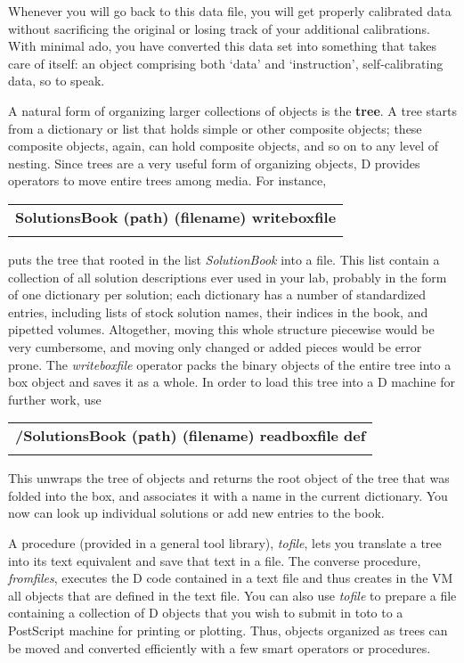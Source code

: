 Whenever  you  will  go back to this data file,  you  will  get  properly calibrated  data  without  sacrificing the original or  losing  track  of your additional calibrations.  With minimal ado,  you have converted this data set into something that takes care of itself:  an object  comprising both `data' and `instruction', self-calibrating data, so to speak.

A natural form of organizing larger collections of objects is the \textbf{tree}. A  tree  starts  from a dictionary or list that  holds  simple  or  other composite objects;  these composite objects,  again,  can hold  composite objects, and so on to any level of nesting. Since trees are a very useful form  of organizing objects,  D provides operators to move  entire  trees among media. For instance,\\

\begin{tabular}{>{\sffamily\bfseries}l}
 SolutionsBook (path) (filename) writeboxfile\\\\
\end{tabular}

\noindent puts the tree that rooted in the list \emph{SolutionBook} into a file. This list contain a collection of all solution descriptions ever used in your lab, probably in the form of one dictionary per solution; each dictionary has a number of standardized entries, including lists of stock solution names, their indices in the book, and pipetted volumes. Altogether, moving this whole structure piecewise would be very cumbersome, and moving only changed or added pieces would be error prone. The \emph{writeboxfile} operator packs the binary objects of the entire tree into a box object and saves it as a whole. In order to load this tree into a D machine for further work, use\\

\begin{tabular}{>{\sffamily\bfseries}l}
 /SolutionsBook (path) (filename) readboxfile def\\\\
\end{tabular}

\noindent This unwraps the tree of objects and returns the root object of the tree that was folded into the box, and associates it with a name in the current dictionary. You now can look up individual solutions or add new entries to the book.

A  procedure (provided in a general tool  library), \emph{tofile},  lets  you translate  a tree into its text equivalent and save that text in a  file. The  converse procedure, \emph{fromfiles},  executes the D code contained in  a text file and thus creates in the VM all objects that are defined in  the  text  file.  You can also use \emph{tofile} to prepare a  file  containing  a collection  of D objects that you wish to submit in toto to a  PostScript machine for printing or plotting. Thus, objects organized as trees can be moved and converted efficiently with a few smart operators or procedures.

